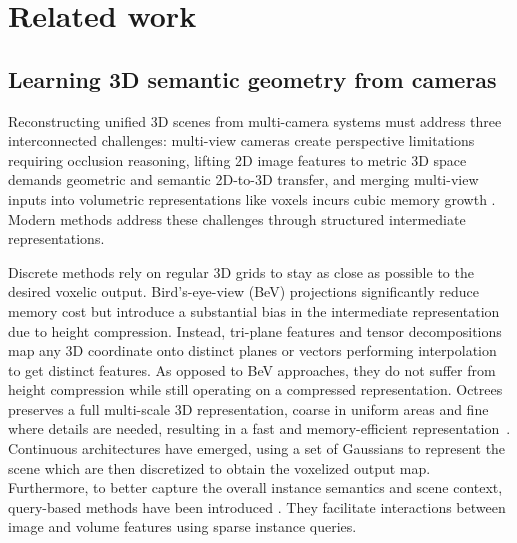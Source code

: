 \section{Related work}
\label{sec:rw}

\subsection{Learning 3D semantic geometry from cameras}



Reconstructing unified 3D scenes from multi-camera systems must address three interconnected challenges: multi-view cameras create perspective limitations requiring occlusion reasoning, lifting 2D image features to metric 3D space demands geometric and semantic 2D-to-3D transfer, and merging multi-view inputs into volumetric representations like voxels incurs cubic memory growth \citep{xu2023survey3Docc}.
Modern methods address these challenges through structured intermediate representations.



Discrete methods rely on regular 3D grids to stay as close as possible to the desired voxelic output.
Bird’s-eye-view (BeV) projections \cite{tian2024mambaocc, li2024viewformer} significantly reduce memory cost but introduce a substantial bias in the intermediate representation due to height compression.
Instead, tri-plane features \cite{huang2023tpv} and tensor decompositions \cite{zhao2024lowrankocc} map any 3D coordinate onto distinct planes or vectors performing interpolation to get distinct features. As opposed to BeV approaches, they do not suffer from height compression while still operating on a compressed representation.
Octrees \cite{lu2023octreeocc} preserves a full multi-scale 3D representation, coarse in uniform areas and fine where details are needed, resulting in a fast and memory-efficient representation~\cite{wei2023surroundocc}.
Continuous architectures have emerged, using a set of Gaussians to represent the scene \cite{huang2024gaussianformer2, huang2024gaussian} which {are then} discretized to obtain the voxelized output map. Furthermore, to better capture the overall instance semantics and scene context, query-based methods have been introduced \cite{jiang2024symphonies}. They facilitate interactions between image and volume features using sparse instance queries.





